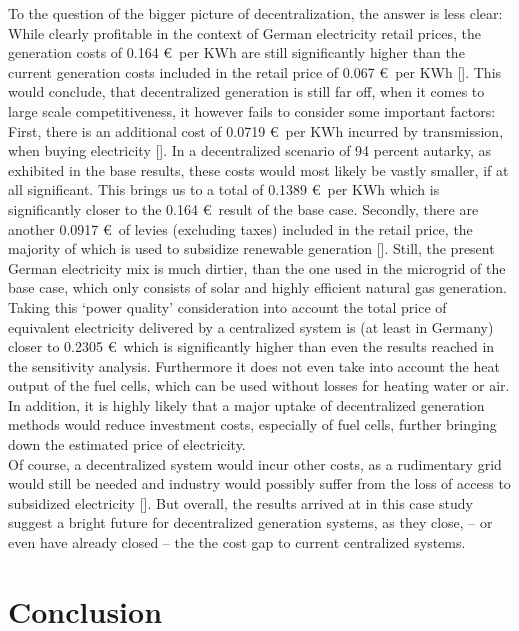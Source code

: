 \documentclass[
	11pt,								%
	DIV10,								%
	a4paper,         					%
	oneside,							%
	headheight=20pt,					%
	footheight=20pt,					%
    parskip=full,						%
    listof=totoc,						%
	bibliography=totoc,					%
	index=totoc,						%
]{scrartcl}
\begin{document}
To the question of the bigger picture of decentralization, the answer is less clear: While clearly profitable in the context of German electricity retail prices, the generation costs of 0.164 \euro\ per KWh are still significantly higher than the current generation costs included in the retail price of 0.067 \euro\ per KWh [\cite{Monitoringbericht20182018}]. This would conclude, that decentralized generation is still far off, when it comes to large scale competitiveness, it however fails to consider some important factors: First, there is an additional cost of 0.0719 \euro\ per KWh incurred by transmission, when buying electricity [\cite{Monitoringbericht20182018}]. 
In a decentralized scenario of 94 percent autarky, as exhibited in the base results, these costs would most likely be vastly smaller, if at all significant. This brings us to a total of 0.1389 \euro\ per KWh which is significantly closer to the 0.164 \euro\ result of the base case. Secondly, there are another 0.0917 \euro\ of levies (excluding taxes) included in the retail price, the majority of which is used to subsidize renewable generation [\cite{Monitoringbericht20182018}]. Still, the present German electricity mix is much dirtier, than the one used in the microgrid of the base case, which only consists of solar and highly efficient natural gas generation. 
Taking this `power quality' consideration into account the total price of equivalent electricity delivered by a centralized system is (at least in Germany) closer to 0.2305 \euro\, which is significantly higher than even the results reached in the sensitivity analysis. Furthermore it does not even take into account the heat output of the fuel cells, which can be used without losses for heating water or air.\\
	In addition, it is highly likely that a major uptake of decentralized generation methods would reduce investment costs, especially of fuel cells, further bringing down the estimated price of electricity. \\
	Of course, a decentralized system would incur other costs, as a rudimentary grid would still be needed and industry would possibly suffer from the loss of access to subsidized electricity [\cite{kuechlerIndustriestrompreiseDeutschlandUnd2014}].
	But overall, the results arrived at in this case study suggest a bright future for decentralized generation systems, as they close, – or even have already closed – the the cost gap to current centralized systems.
	
\newpage
{}	
\section{Conclusion}
\end{document}
